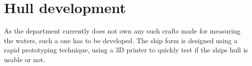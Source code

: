 \section{Hull development}
As the department currently does not own any such crafts made for measuring the waters, such a one has to be developed. The ship form is designed using a rapid prototyping technique, using a 3D printer to quickly test if the ships hull is usable or not. 